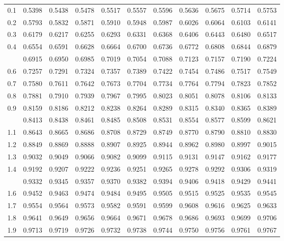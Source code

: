 \documentclass[12pt,a4paper]{article}
\begin{document}
\begin{enumerate}
\begin{center}
\begin{longtable}{ccccccccccc}
0.1 & 0.5398 & 0.5438 & 0.5478 & 0.5517 & 0.5557 & 0.5596 & 0.5636 & 0.5675 & 0.5714 & 0.5753 \\
0.2 & 0.5793 & 0.5832 & 0.5871 & 0.5910 & 0.5948 & 0.5987 & 0.6026 & 0.6064 & 0.6103 & 0.6141 \\
0.3 & 0.6179 & 0.6217 & 0.6255 & 0.6293 & 0.6331 & 0.6368 & 0.6406 & 0.6443 & 0.6480 & 0.6517 \\
0.4 & 0.6554 & 0.6591 & 0.6628 & 0.6664 & 0.6700 & 0.6736 & 0.6772 & 0.6808 & 0.6844 & 0.6879 \\
\addlinespace
0.5 & 0.6915 & 0.6950 & 0.6985 & 0.7019 & 0.7054 & 0.7088 & 0.7123 & 0.7157 & 0.7190 & 0.7224 \\
0.6 & 0.7257 & 0.7291 & 0.7324 & 0.7357 & 0.7389 & 0.7422 & 0.7454 & 0.7486 & 0.7517 & 0.7549 \\
0.7 & 0.7580 & 0.7611 & 0.7642 & 0.7673 & 0.7704 & 0.7734 & 0.7764 & 0.7794 & 0.7823 & 0.7852 \\
0.8 & 0.7881 & 0.7910 & 0.7939 & 0.7967 & 0.7995 & 0.8023 & 0.8051 & 0.8078 & 0.8106 & 0.8133 \\
0.9 & 0.8159 & 0.8186 & 0.8212 & 0.8238 & 0.8264 & 0.8289 & 0.8315 & 0.8340 & 0.8365 & 0.8389 \\
\addlinespace
1.0 & 0.8413 & 0.8438 & 0.8461 & 0.8485 & 0.8508 & 0.8531 & 0.8554 & 0.8577 & 0.8599 & 0.8621 \\
1.1 & 0.8643 & 0.8665 & 0.8686 & 0.8708 & 0.8729 & 0.8749 & 0.8770 & 0.8790 & 0.8810 & 0.8830 \\
1.2 & 0.8849 & 0.8869 & 0.8888 & 0.8907 & 0.8925 & 0.8944 & 0.8962 & 0.8980 & 0.8997 & 0.9015 \\
1.3 & 0.9032 & 0.9049 & 0.9066 & 0.9082 & 0.9099 & 0.9115 & 0.9131 & 0.9147 & 0.9162 & 0.9177 \\
1.4 & 0.9192 & 0.9207 & 0.9222 & 0.9236 & 0.9251 & 0.9265 & 0.9278 & 0.9292 & 0.9306 & 0.9319 \\
\addlinespace
1.5 & 0.9332 & 0.9345 & 0.9357 & 0.9370 & 0.9382 & 0.9394 & 0.9406 & 0.9418 & 0.9429 & 0.9441 \\
1.6 & 0.9452 & 0.9463 & 0.9474 & 0.9484 & 0.9495 & 0.9505 & 0.9515 & 0.9525 & 0.9535 & 0.9545 \\
1.7 & 0.9554 & 0.9564 & 0.9573 & 0.9582 & 0.9591 & 0.9599 & 0.9608 & 0.9616 & 0.9625 & 0.9633 \\
1.8 & 0.9641 & 0.9649 & 0.9656 & 0.9664 & 0.9671 & 0.9678 & 0.9686 & 0.9693 & 0.9699 & 0.9706 \\
1.9 & 0.9713 & 0.9719 & 0.9726 & 0.9732 & 0.9738 & 0.9744 & 0.9750 & 0.9756 & 0.9761 & 0.9767 \\

\end{longtable}
\end{center}
\end{enumerate}
\end{document}
